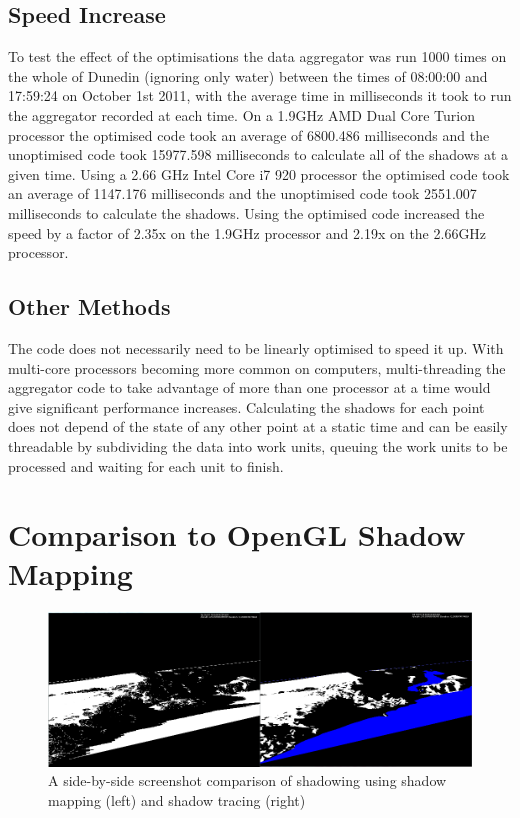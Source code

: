 \documentclass[12pt]{report}
\begin{document}
\subsection{Speed Increase}
To test the effect of the optimisations the data aggregator was run 1000 times on the whole of Dunedin (ignoring only water) between the times of 08:00:00 and 17:59:24 on October 1st 2011, with the average time in milliseconds it took to run the aggregator recorded at each time. On a 1.9GHz AMD Dual Core Turion processor the optimised code took an average of 6800.486 milliseconds and the unoptimised code took 15977.598 milliseconds to calculate all of the shadows at a given time. Using a 2.66 GHz Intel Core i7 920 processor the optimised code took an average of 1147.176 milliseconds and the unoptimised code took 2551.007 milliseconds to calculate the shadows. Using the optimised code increased the speed by a factor of 2.35x on the 1.9GHz processor and 2.19x on the 2.66GHz processor.

\subsection{Other Methods}
The code does not necessarily need to be linearly optimised to speed it up. With multi-core processors becoming more common on computers, multi-threading the aggregator code to take advantage of more than one processor at a time would give significant performance increases. Calculating the shadows for each point does not depend of the state of any other point at a static time and can be easily threadable by subdividing the data into work units, queuing the work units to be processed and waiting for each unit to finish.

\section{Comparison to OpenGL Shadow Mapping}
\begin{figure}[h]
\centering
\includegraphics[scale=0.6]{aggregatorvsshadowmapping.png}
\caption{A side-by-side screenshot comparison of shadowing using shadow mapping (left) and shadow tracing (right)}
\label{image:aggregatorvsshadowmapping}
\end{figure}
\end{document}
